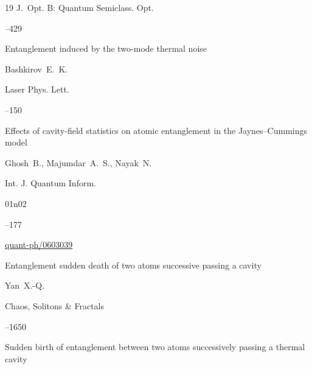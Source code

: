 \begin{thebibliography}{19}
\jour J.~Opt. B: Quantum Semiclass. Opt.




--429





\paper Entanglement induced by the two-mode thermal noise

\by   Bashkirov~E.~K.

\jour Laser Phys. Lett.




--150





\paper Effects of cavity-field statistics on atomic entanglement in the Jaynes–Cummings model

\by   Ghosh~B.,  Majumdar~A.~S., Nayak~N.

\jour  Int. J. Quantum Inform.



\issue  01n02 

--177


\arxiv \href{arxiv.org/abs/quant-ph/0603039}{quant-ph/0603039}




\paper Entanglement sudden death of two atoms successive passing a cavity

\by   Yan~X.-Q.

\jour Chaos, Solitons \& Fractals




--1650





\paper Sudden birth of entanglement between two atoms successively passing a thermal cavity


\end{thebibliography}
